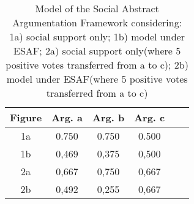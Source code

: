 \renewcommand{\tabcolsep}{0.3cm}
\begin{table}[ht]
  \caption{Model of the Social Abstract Argumentation Framework considering: 1a) social support only; 1b) model under ESAF; 2a) social support only(where 5 positive votes transferred from a to c); 2b) model under ESAF(where 5 positive votes transferred from a to c)\\}
  \centering %
\begin{tabular}{c c c c c c} %
\hline\hline %
Figure &  Arg. a & Arg. b & Arg. c  \\ [0.7ex] %
\hline %
1a & 0.750 & 0.750 & 0.500 \\ %
1b & 0,469 & 0,375 & 0,500 \\
2a & 0,667 & 0,750 & 0,667 \\
2b & 0,492 & 0,255 & 0,667 \\ [1ex] %
\hline %
\end{tabular}
\label{table:aa} %
\end{table}